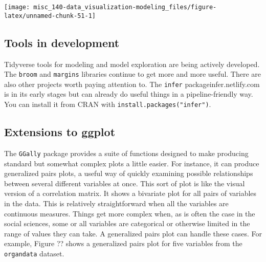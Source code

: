 \documentclass[]{book}
\begin{document}
\begin{center}\texttt{[image: misc\_140-data\_visualization-modeling\_files/figure-latex/unnamed-chunk-51-1]} \end{center}

\hypertarget{tools-in-development}{%
\subsection{Tools in development}\label{tools-in-development}}

Tidyverse tools for modeling and model exploration are being actively developed. The \texttt{broom} and \texttt{margins} libraries continue to get more and more useful. There are also other projects worth paying attention to. The \texttt{infer} packageinfer.netlify.com is in its early stages but can already do useful things in a pipeline-friendly way. You can install it from CRAN with \texttt{install.packages("infer")}.

\hypertarget{extensions-to-ggplot}{%
\subsection{Extensions to ggplot}\label{extensions-to-ggplot}}

The \texttt{GGally} package provides a suite of functions designed to make producing standard but somewhat complex plots a little easier. For instance, it can produce generalized pairs plots, a useful way of quickly examining possible relationships between several different variables at once. This sort of plot is like the visual version of a correlation matrix. It shows a bivariate plot for all pairs of variables in the data. This is relatively straightforward when all the variables are continuous measures. Things get more complex when, as is often the case in the social sciences, some or all variables are categorical or otherwise limited in the range of values they can take. A generalized pairs plot can handle these cases. For example, Figure ?? shows a generalized pairs plot for five variables from the \texttt{organdata} dataset.
\end{document}
